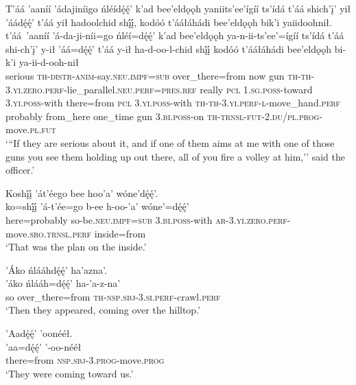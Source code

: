 \ea\label{ex:text1-64-2}
T’áá ’aaníí ’ádajiníigo ńléídę́ę́’ k’ad bee’eldǫǫh yaniits’ee’ígíí ts’ídá t’áá shich’į’ yił ’áádę́ę́’ t’áá yił hadoolchid shį́į́, kodóó t’ááłáhádi bee’eldǫǫh bik’i yaiidoohnił.\\
\gll t’áá~{’aaníí}	’á-da-ji-níi=go	ńléí=dę́ę́’	k’ad	bee’eldǫǫh	ya-n-ii-ts’ee’=ígíí	ts’ídá	t’áá	shi-ch’į’	y-ił	’áá=dę́ę́’	t’áá	y-ił	ha-d-oo-l-chid	shį́į́	kodóó	t’ááłáhádi	bee’eldǫǫh	bi-k’i	ya-ii-d-ooh-nił\\
     serious	\textsc{th}-\textsc{distr}-\textsc{anim}-say.\textsc{neu}.\textsc{impf}=\textsc{sub}	over\_there=from	now	gun	\textsc{th}-\textsc{th}-3.\textsc{yi}.\textsc{zero}.\textsc{perf}-lie\_parallel.\textsc{neu}.\textsc{perf}=\textsc{pres}.\textsc{ref}	really	\textsc{pcl}	1.\textsc{sg}.\textsc{poss}-toward	3.\textsc{yi}.\textsc{poss}-with	there=from	\textsc{pcl}	3.\textsc{yi}.\textsc{poss}-with	\textsc{th}-\textsc{th}-3.\textsc{yi}.\textsc{perf}-\textsc{l}-move\_hand.\textsc{perf}	probably	from\_here	one\_time	gun	3.\textsc{bi}.\textsc{poss}-on	\textsc{th}-\textsc{trnsl}-\textsc{fut}-2.\textsc{du}/\textsc{pl}.\textsc{prog}-move.\textsc{pl}.\textsc{fut}\\
\glt `{``}If they are serious about it, and if one of them aims at me with one of those guns you see them holding up out there, all of you fire a volley at him,'' said the officer.'
\z

\ea\label{ex:text1-64-3}
Koshį́į́ ’át’éego bee hoo’a’ wóne’dę́ę́’.\\
\gll ko=shį́į́	’á-t’ée=go	b-ee	h-oo-’a’	wóne’=dę́ę́’\\
     here=probably	so-be.\textsc{neu}.\textsc{impf}=\textsc{sub}	3.\textsc{bi}.\textsc{poss}-with	\textsc{ar}-3.\textsc{yi}.\textsc{zero}.\textsc{perf}-move.\textsc{sro}.\textsc{trnsl}.\textsc{perf}	inside=from\\
\glt `That was the plan on the inside.'
\z

\ea\label{ex:text1-65-1}
’Áko ńlááhdę́ę́’ ha’azna’.\\
\gll ’áko	ńlááh=dę́ę́’	ha-’a-z-na’\\
     so	over\_there=from	\textsc{th}-\textsc{nsp}.\textsc{sbj}-3.\textsc{si}.\textsc{perf}-crawl.\textsc{perf}\\
\glt `Then they appeared, coming over the hilltop.'
\z

\ea\label{ex:text1-65-2}
’Aadę́ę́’ ’oonééł.\\
\gll ’aa=dę́ę́’	’-oo-nééł\\
     there=from	\textsc{nsp}.\textsc{sbj}-3.\textsc{prog}-move.\textsc{prog}\\
\glt `They were coming toward us.'
\z

